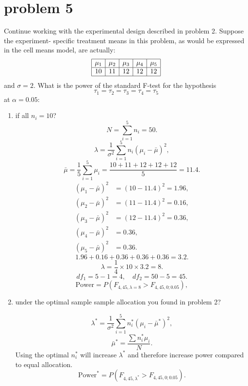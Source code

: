 \documentclass{article}
\begin{document}
\section{problem 5}
Continue working with the experimental design described in problem 2. Suppose the experiment-
specific treatment means in this problem, as would be expressed in the cell means model, are
actually:
$$
	\begin{array}{|c|c|c|c|c|}
		\hline
		\mu_1 & \mu_2 & \mu_3 & \mu_4 & \mu_5 \\
		\hline
		10    & 11    & 12    & 12    & 12    \\
		\hline
	\end{array}
$$
and $\sigma=2$. What is the power of the standard F-test for the hypothesis
$$
	\tau_1 = \tau_2 = \tau_3 = \tau_4 = \tau_5
$$
at $\alpha=0.05$:
\begin{enumerate}
	\item if all $n_i=10$?
	      \[
		      N = \sum_{i=1}^5 n_i = 50.
	      \]
	      \[
		      \lambda = \frac{1}{\sigma^2} \sum_{i=1}^5 n_i (\mu_i - \bar{\mu})^2,
	      \]
	      \[
		      \bar{\mu} = \frac{1}{5} \sum_{i=1}^5 \mu_i = \frac{10 + 11 + 12 + 12 + 12}{5} = 11.4.
	      \]
	      \[
		      \begin{aligned}
			      (\mu_1 - \bar{\mu})^2 & = (10 - 11.4)^2 = 1.96, \\
			      (\mu_2 - \bar{\mu})^2 & = (11 - 11.4)^2 = 0.16, \\
			      (\mu_3 - \bar{\mu})^2 & = (12 - 11.4)^2 = 0.36, \\
			      (\mu_4 - \bar{\mu})^2 & = 0.36,                 \\
			      (\mu_5 - \bar{\mu})^2 & = 0.36.
		      \end{aligned}
	      \]
	      \[
		      1.96 + 0.16 + 0.36 + 0.36 + 0.36 = 3.2.
	      \]
	      \[
		      \lambda = \frac{1}{4} \times 10 \times 3.2 = 8.
	      \]
	      \[
		      df_1 = 5 - 1 = 4, \quad df_2 = 50 - 5 = 45.
	      \]
	      \[
		      \text{Power} = P\left(F_{4,45,\lambda=8} > F_{4,45,0;0.05}\right),
	      \]

	\item under the optimal sample sample allocation you found in problem 2?

	      \[
		      \lambda^* = \frac{1}{\sigma^2} \sum_{i=1}^5 n_i^* (\mu_i - \bar{\mu}^*)^2,
	      \]
	      \[
		      \bar{\mu}^* = \frac{\sum n_i^* \mu_i}{N}.
	      \]
	      Using the optimal $n_i^*$ will increase $\lambda^*$ and therefore increase power compared to equal allocation.
	      \[
		      \text{Power}^* = P\left(F_{4,45,\lambda^*} > F_{4,45,0;0.05}\right).
	      \]


\end{enumerate}
\end{document}
